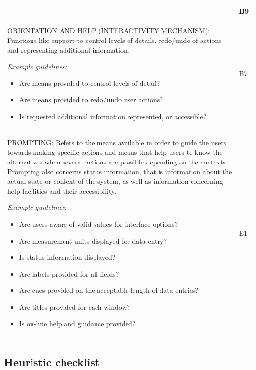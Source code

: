 \begin{longtable}{|p{12cm}|p{1cm}|}
& B9 \\ \hline
ORIENTATION AND HELP (INTERACTIVITY MECHANISM): Functions like support to control levels of details, redo/undo of actions and representing additional information. 
\par
\textit{Example guidelines:}
\begin{itemize}
\item Are means provided to control levels of detail?
\item Are means provided to redo/undo user actions?
\item Is requested additional information represented, or accessible?
\end{itemize}

& B7 \\ \hline
PROMPTING: Refers to the means available in order to guide the users towards making specific actions and means that help users to know the alternatives when several actions are possible depending on the contexts. Prompting also concerns status information, that is information about the actual state or context of the system, as well as information concerning help facilities and their accessibility.
\par
\textit{Example guidelines:}
\begin{itemize}
\item Are users aware of valid values for interface options?
\item Are measurement units displayed for data entry?
\item Is status information displayed?
\item Are labels provided for all fields?
\item Are cues provided on the acceptable length of data entries?
\item Are titles provided for each window?
\item Is on-line help and guidance provided?
\end{itemize}

& E1 \\ 
\label{tab:heuristics}
\end{longtable}

\subsection{Heuristic checklist}\label{sect:checklist}

